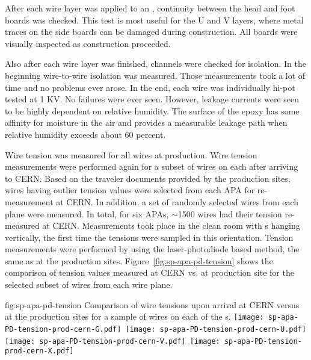 
After each wire layer was applied to an , continuity between the head and foot boards was checked.  This test is most useful for the U and V layers, where metal traces on the side boards can be damaged during construction. All boards were visually inspected as construction proceeded.

Also after each wire layer was finished, channels were checked for isolation.  In the beginning wire-to-wire isolation was measured. Those measurements took a lot of time and no problems ever arose.  In the end, each wire was individually hi-pot tested at 1 KV. No failures were ever seen. However, leakage currents were seen to be highly dependent on relative humidity.  The surface of the epoxy has some affinity for moisture in the air and provides a measurable leakage path when relative humidity exceeds about 60 percent.

Wire tension was measured for all wires at production. Wire tension measurements were performed again for a subset of wires on each  after arriving to CERN.  Based on the traveler documents provided by the production sites, wires having outlier tension values were selected from each APA for re-measurement at CERN. In addition, a set of randomly selected wires from each plane were measured. In total, for six APAs, $\sim$1500 wires had their tension re-measured at CERN. Measurements took place in the clean room with s hanging vertically, the first time the tensions were sampled in this orientation. Tension measurements were performed by using the laser-photodiode based method, the same as at the production sites. Figure~\ref{fig:sp-apa-pd-tension} shows the comparison of tension values measured at CERN vs. at production site for the selected subset of wires from each wire plane.

\begin{dunefigure}{fig:sp-apa-pd-tension}
{Comparison of wire tensions upon arrival at CERN versus at the production sites for a sample of wires on each of the  s.}
\mbox{\texttt{[image: sp-apa-PD-tension-prod-cern-G.pdf]} %
\texttt{[image: sp-apa-PD-tension-prod-cern-U.pdf]}} \\
\vspace{3mm}
\mbox{\texttt{[image: sp-apa-PD-tension-prod-cern-V.pdf]} %
\texttt{[image: sp-apa-PD-tension-prod-cern-X.pdf]}}
\end{dunefigure}

